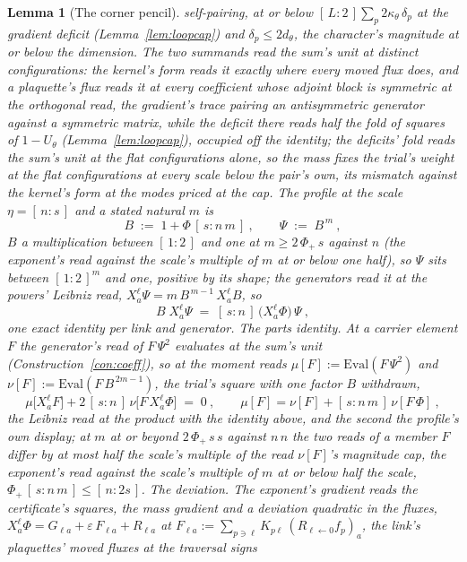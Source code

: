 \documentclass[11pt]{article}
\newtheorem{lemma}{Lemma}
\theoremstyle{definition}
\begin{document}
\begin{lemma}[The corner pencil]
self-pairing, at or below $[\,L:2\,]\sum_p2\kappa_\theta\,\delta_p$
at the gradient deficit (Lemma~\ref{lem:loopcap}) and
$\delta_p\le2d_\theta$, the character's magnitude at or below the
dimension. The two summands read the sum's unit at distinct
configurations: the kernel's form reads it exactly where every
moved flux does, and a plaquette's flux reads it at every
coefficient whose adjoint block is symmetric at the orthogonal
read, the gradient's trace pairing an antisymmetric generator
against a symmetric matrix, while the deficit there reads half the
fold of squares of $1-U_\theta$ (Lemma~\ref{lem:loopcap}), occupied
off the identity; the deficits' fold reads the sum's unit at the
flat configurations alone, so the mass fixes the trial's weight at
the flat configurations at every scale below the pair's own, its
mismatch against the kernel's form at the modes priced at the cap.
The \emph{profile} at the scale $\eta=[\,n:s\,]$ and a
stated natural $m$ is
\[
B\;:=\;1+\Phi\,[\,s:n\,m\,]\ ,
\qquad
\Psi\;:=\;B^{\,m}\ ,
\]
$B$ a multiplication between $[\,1:2\,]$ and one at
$m\ge2\,\Phi_+\,s$ against $n$ (the exponent's read against the
scale's multiple of $m$ at or below one half), so $\Psi$ sits
between $[\,1:2\,]^{m}$ and one, positive by its shape; the
generators read it at the powers' Leibniz read,
$X_a^{\ell}\Psi=m\,B^{\,m-1}\,X_a^{\ell}B$, so
\[
B\;X_a^{\ell}\Psi\;=\;[\,s:n\,]\,\big(X_a^{\ell}\Phi\big)\,\Psi\ ,
\]
one exact identity per link and generator. \emph{The parts
identity.} At a carrier element $F$ the generator's read of
$F\,\Psi^{2}$ evaluates at the sum's unit (Construction~\ref{con:coeff}),
so at the \emph{moment reads} $\mu[F]:=\mathrm{Eval}(F\,\Psi^{2})$
and $\nu[F]:=\mathrm{Eval}(F\,B^{\,2m-1})$, the trial's square with
one factor $B$ withdrawn,
\[
\mu\big[X_a^{\ell}F\big]+2\,[\,s:n\,]\,\nu\big[F\,X_a^{\ell}\Phi\big]
\;=\;0\ ,
\qquad
\mu[F]=\nu[F]+[\,s:n\,m\,]\,\nu[F\,\Phi]\ ,
\]
the Leibniz read at the product with the identity above, and the
second the profile's own display; at $m$ at or beyond
$2\,\Phi_+\,s\,s$ against $n\,n$ the two reads of a member $F$
differ by at most half the scale's multiple of the read $\nu[F]$'s
magnitude cap, the exponent's read against the scale's multiple of
$m$ at or below half the scale, $\Phi_+\,[\,s:n\,m\,]\le[\,n:2s\,]$. \emph{The deviation.} The exponent's gradient reads the
certificate's squares, the \emph{mass gradient} and a deviation
quadratic in the fluxes,
$X_a^{\ell}\Phi=G_{\ell a}+\varepsilon\,F_{\ell a}+R_{\ell a}$ at
$F_{\ell a}:=\sum_{p\ni\ell}K_{p\ell}\,(R_{\ell\leftarrow0}f_p)_a$,
the link's plaquettes' moved fluxes at the traversal signs

\end{lemma}
\end{document}
